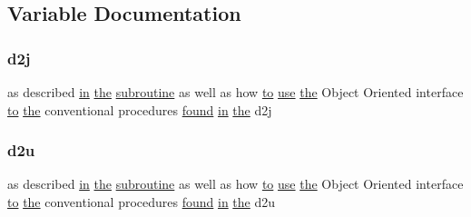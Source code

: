 \subsection{Variable Documentation}
\mbox{\label{M__time_83_8txt_a8de06533a8f0f8b49b9398aeda11296b}} 
\subsubsection{\texorpdfstring{d2j}{d2j}}
{\footnotesize\ttfamily as described \hyperlink{M__journal_83_8txt_afce72651d1eed785a2132bee863b2f38}{in} \hyperlink{M__stopwatch_83_8txt_a0f266597de2e57eb3aa964927bb30e14}{the} \hyperlink{M__stopwatch_83_8txt_acfbcff50169d691ff02d4a123ed70482}{subroutine} as well as how \hyperlink{M__stopwatch_83_8txt_a97209fd3e34ef701c0a9734280779cbb}{to} \hyperlink{intro__blas1_83_8txt_a04fa2694d85f67a675bb3f45f7241f48}{use} \hyperlink{M__stopwatch_83_8txt_a0f266597de2e57eb3aa964927bb30e14}{the} Object Oriented interface \hyperlink{M__stopwatch_83_8txt_a97209fd3e34ef701c0a9734280779cbb}{to} \hyperlink{M__stopwatch_83_8txt_a0f266597de2e57eb3aa964927bb30e14}{the} conventional procedures \hyperlink{what__overview_81_8txt_a4a5cd559ce9a19bdc777ce034bc845d1}{found} \hyperlink{M__journal_83_8txt_afce72651d1eed785a2132bee863b2f38}{in} \hyperlink{M__stopwatch_83_8txt_a0f266597de2e57eb3aa964927bb30e14}{the} d2j}

\mbox{\label{M__time_83_8txt_ab56b0f002a88dac7ff0ec59238e7aad2}} 
\subsubsection{\texorpdfstring{d2u}{d2u}}
{\footnotesize\ttfamily as described \hyperlink{M__journal_83_8txt_afce72651d1eed785a2132bee863b2f38}{in} \hyperlink{M__stopwatch_83_8txt_a0f266597de2e57eb3aa964927bb30e14}{the} \hyperlink{M__stopwatch_83_8txt_acfbcff50169d691ff02d4a123ed70482}{subroutine} as well as how \hyperlink{M__stopwatch_83_8txt_a97209fd3e34ef701c0a9734280779cbb}{to} \hyperlink{intro__blas1_83_8txt_a04fa2694d85f67a675bb3f45f7241f48}{use} \hyperlink{M__stopwatch_83_8txt_a0f266597de2e57eb3aa964927bb30e14}{the} Object Oriented interface \hyperlink{M__stopwatch_83_8txt_a97209fd3e34ef701c0a9734280779cbb}{to} \hyperlink{M__stopwatch_83_8txt_a0f266597de2e57eb3aa964927bb30e14}{the} conventional procedures \hyperlink{what__overview_81_8txt_a4a5cd559ce9a19bdc777ce034bc845d1}{found} \hyperlink{M__journal_83_8txt_afce72651d1eed785a2132bee863b2f38}{in} \hyperlink{M__stopwatch_83_8txt_a0f266597de2e57eb3aa964927bb30e14}{the} d2u}

